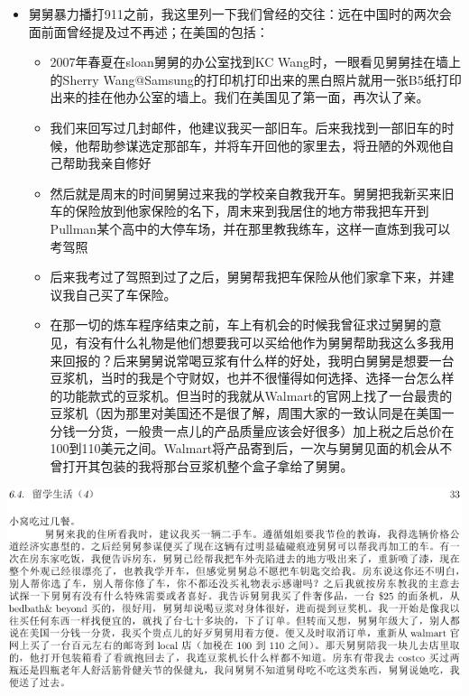 \documentclass[9pt, b5paper]{article}
\begin{document}
\begin{enumerate}
\begin{itemize}
\item 舅舅暴力播打911之前，我这里列一下我们曾经的交往：远在中国时的两次会面前面曾经提及过不再述；在美国的包括：
\begin{itemize}
\item 2007年春夏在sloan舅舅的办公室找到KC Wang时，一眼看见舅舅挂在墙上的Sherry Wang@Samsung的打印机打印出来的黑白照片就用一张B5纸打印出来的挂在他办公室的墙上。我们在美国见了第一面，再次认了亲。
\item 我们来回写过几封邮件，他建议我买一部旧车。后来我找到一部旧车的时候，他帮助参谋选定那部车，并将车开回他的家里去，将丑陋的外观他自己帮助我亲自修好
\item 然后就是周末的时间舅舅过来我的学校亲自教我开车。舅舅把我新买来旧车的保险放到他家保险的名下，周末来到我居住的地方带我把车开到Pullman某个高中的大停车场，并在那里教我练车，这样一直炼到我可以考驾照
\item 后来我考过了驾照到过了之后，舅舅帮我把车保险从他们家拿下来，并建议我自己买了车保险。
\item 在那一切的炼车程序结束之前，车上有机会的时候我曾征求过舅舅的意见，有没有什么礼物是他们想要我可以买给他作为舅舅帮助我这么多我用来回报的？后来舅舅说常喝豆浆有什么样的好处，我明白舅舅是想要一台豆浆机，当时的我是个守财奴，也并不很懂得如何选择、选择一台怎么样的功能款式的豆浆机。但当时的我就从Walmart的官网上找了一台最贵的豆浆机（因为那里对美国还不是很了解，周围大家的一致认同是在美国一分钱一分货，一般贵一点儿的产品质量应该会好很多）加上税之后总价在100到110美元之间。Walmart将产品寄到后，一次与舅舅见面的机会从不曾打开其包装的我将那台豆浆机整个盒子拿给了舅舅。
\end{itemize}
\end{itemize}

\begin{center}
\includegraphics[width=.9\linewidth]{./pic/p1p33.png}
\end{center}


\end{enumerate}
\end{document}
